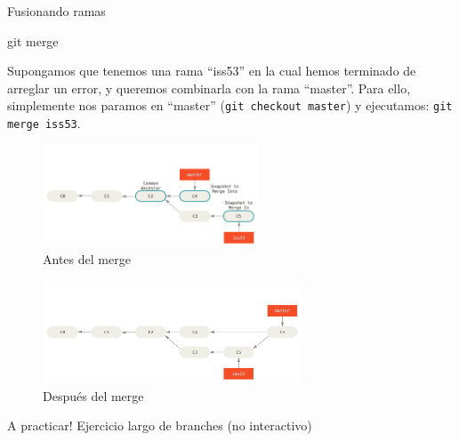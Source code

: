\begin{frame}[t]{Fusionando ramas}
    \begin{comando}
        git merge
    \end{comando}

    \begin{block}{}
        Supongamos que tenemos una rama ``iss53'' en la cual hemos terminado de arreglar un error, y queremos combinarla con la rama ``master''.
        Para ello, simplemente nos paramos en ``master'' (\texttt{git checkout master}) y ejecutamos: \texttt{git merge iss53}.
    \end{block}

         {
        	\begin{figure}[ht]
        		\begin{center}
        			\includegraphics[height=1.2in]{images/merge-1.png}
        		\end{center}
        		\caption{Antes del merge}
        	\end{figure}
        }
         {
            \begin{figure}[ht]
        		\begin{center}
        			\includegraphics[height=1.2in]{images/merge-2.png}
        		\end{center}
        		\caption{Después del merge}
        	\end{figure}
        }
\end{frame}

\begin{frame}[t]{A practicar!}
    Ejercicio largo de branches (no interactivo)

\end{frame}

